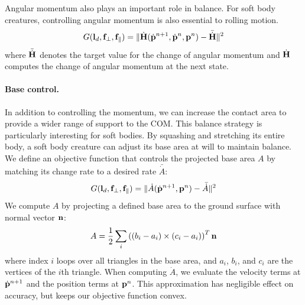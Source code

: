 Angular momentum also plays an important role in balance. For soft
body creatures, controlling angular momentum is also essential to
rolling motion.
\begin{equation}
G(\mathbf{l}_d, \mathbf{f}_\perp, \mathbf{f}_\parallel) = \| \dot{\mathbf{H}}(\dot{\mathbf{p}}^{n+1}, \dot{\mathbf{p}}^n, \mathbf{p}^n) - \bar{\dot{\mathbf{H}}} \|^2
\label{eqn:angular}
\end{equation}
where $\bar{\dot{\mathbf{H}}}$ denotes the target value for the change of
angular momentum and $\dot{\mathbf{H}}$ computes the change of angular
momentum at the next state.

\paragraph{Base control.}
In addition to controlling the momentum, we can increase the contact area
to provide a wider range of support to the COM. This balance strategy
is particularly interesting for soft bodies. By squashing and
stretching its entire body, a soft body creature can adjust its base
area at will to maintain balance. We define an objective function that
controls the projected base area $A$ by matching its change rate to
a desired rate $\bar{\dot{A}}$:
\begin{equation}
G(\mathbf{l}_d, \mathbf{f}_\perp, \mathbf{f}_\parallel) =
\| \dot{A}(\dot{\mathbf{p}}^{n+1}, \mathbf{p}^n)  - \bar{\dot{A}}\|^2
\end{equation}
We compute $A$ by projecting a defined base area to the ground surface with
normal vector $\mathbf{n}$:
\begin{equation}
A = \frac{1}{2} \sum_i \left( (b_i - a_i) \times (c_i - a_i) \right)^T \mathbf{n}
\end{equation}
where index $i$ loops over all triangles in the base area, and $a_i$,
$b_i$, and $c_i$ are the vertices of the $i$th triangle. When
computing $\dot{A}$, we evaluate the velocity terms at
$\dot{\mathbf{p}}^{n+1}$ and the position terms at $\mathbf{p}^n$. This
approximation has negligible effect on accuracy, but keeps our
objective function convex.

